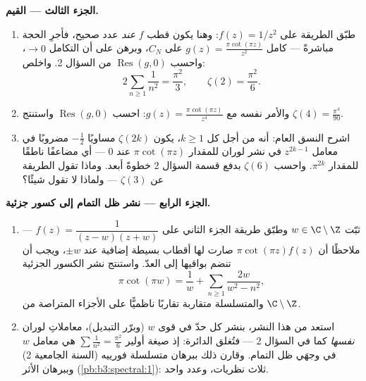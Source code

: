 \begin{problem}
\medskip
\noindent\textbf{الجزء الثالث --- القيم.}
\begin{enumerate}[resume]
  \item طبّق الطريقة على $f(z) = 1/z^2$: وهنا يكون قطب $f$
        \emph{عند} عدد صحيح، فأجرِ الحجة مباشرةً --- كامل
        $g(z) = \frac{\pi\cot(\pi
        z)}{z^2}$ على $C_N$، وبرهن على أن التكامل $\to 0$،
        واحسب $\operatorname{Res}(g, 0)$ من السؤال 2. واخلص:
        \[
        2\sum_{n\geq1}\frac1{n^2} = \frac{\pi^2}{3},
        \qquad \zeta(2) = \frac{\pi^2}6 .
        \]
  \item والأمر نفسه مع $g(z) = \frac{\pi\cot(\pi z)}{z^4}$: احسب $\operatorname{Res}(g, 0)$ واستنتج $\zeta(4) = \frac{\pi^4}{90}$.
  \item اشرح النسق العام: أنه من أجل كل $k \geq 1$، يكون
        $\zeta(2k)$ مساويًا $-\frac12$ مضروبًا في معامل
        $z^{2k-1}$ في نشر لوران للمقدار $\pi\cot(\pi
        z)$ عند $0$ ---
        أي مضاعفًا ناطقًا للمقدار $\pi^{2k}$. واحسب $\zeta(6)$
        بدفع قسمة السؤال 2 خطوةً أبعد. وماذا تقول الطريقة عن
        $\zeta(3)$ --- ولماذا لا تقول شيئًا؟
\end{enumerate}

\medskip
\noindent\textbf{الجزء الرابع --- نشر ظل التمام إلى كسور
جزئية.}
\begin{enumerate}[resume]
  \item ثبّت $w \in \C\setminus\Z$ وطبّق طريقة الجزء الثاني على $f(z) = \dfrac{1}{(z - w)(z + w)}$ ---
        ملاحظًا أن $\pi\cot(\pi z)f(z)$ صارت لها أقطاب بسيطة إضافية عند
        $\pm w$، ويجب أن تنضم بواقيها إلى العدّ. واستنتج نشر
        الكسور الجزئية
        \[
        \pi\cot(\pi w) = \frac1w +
        \sum_{n\geq1}\frac{2w}{w^2 - n^2},
        \]
        والمتسلسلة متقاربة تقاربًا ناظميًّا على الأجزاء
        المتراصة من $\C\setminus\Z$.
  \item استعد من هذا النشر، بنشر كل حدّ في قوى $w$ (وبرّر
        التبديل)، معاملاتِ لوران \emph{نفسها} كما في السؤال 2
        --- فتُغلق الدائرة: إذ صيغة أولير $\sum\frac1{n^2} = \frac{\pi^2}6$ هي معامل $w$
        في وجهَي ظل التمام. وقارن ذلك ببرهان متسلسلة فورييه
        (السنة الجامعية 2) وببرهان الأثر (\cref{pb:b3:spectral:1}): ثلاث
        نظريات، وعدد واحد.
\end{enumerate}


\end{problem}

